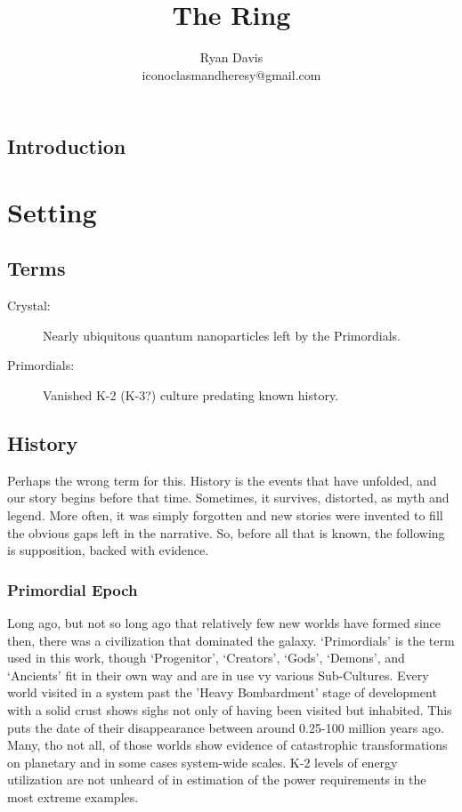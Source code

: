 \documentclass[letterpaper, 12pt]{book}
\title{The Ring}
\author{Ryan Davis\\iconoclasmandheresy@gmail.com}
\begin{document}
\maketitle
\frontmatter
\tableofcontents
\clearpage
\section{Introduction}
\mainmatter
\chapter{Setting}
\section{Terms}
\begin{description}
\item[Crystal:] Nearly ubiquitous quantum nanoparticles left by the Primordials.
\item[Primordials:] Vanished K-2 (K-3?) culture predating known history.
\end{description}
\section{History}
Perhaps the wrong term for this.
History is the events that have unfolded, and our story begins before that time.
Sometimes, it survives, distorted, as myth and legend.
More often, it was simply forgotten and new stories were invented to fill the obvious gaps left in the narrative.
So, before all that is known, the following is supposition, backed with evidence.
\subsection{Primordial Epoch}
Long ago, but not so long ago that relatively few new worlds have formed since then, there was a civilization that dominated the galaxy.
`Primordials' is the term used in this work, though `Progenitor', `Creators', `Gods', `Demons', and `Ancients' fit in their own way and are in use vy various Sub-Cultures.
Every world visited in a system past the 'Heavy Bombardment' stage of development with a solid crust shows sighs not only of having been visited but inhabited.
This puts the date of their disappearance between around 0.25-100 million years ago.
Many, tho not all, of those worlds show evidence of catastrophic transformations on planetary and in some cases system-wide scales.
K-2 levels of energy utilization are not unheard of in estimation of the power requirements in the most extreme examples.
\end{document}

